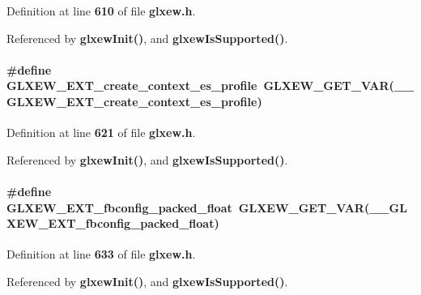 Definition at line {\bf 610} of file {\bf glxew.\+h}.



Referenced by {\bf glxew\+Init()}, and {\bf glxew\+Is\+Supported()}.

\paragraph[{G\+L\+X\+E\+W\+\_\+\+E\+X\+T\+\_\+create\+\_\+context\+\_\+es\+\_\+profile}]{\setlength{\rightskip}{0pt plus 5cm}\#define G\+L\+X\+E\+W\+\_\+\+E\+X\+T\+\_\+create\+\_\+context\+\_\+es\+\_\+profile~{\bf G\+L\+X\+E\+W\+\_\+\+G\+E\+T\+\_\+\+V\+AR}({\bf \+\_\+\+\_\+\+G\+L\+X\+E\+W\+\_\+\+E\+X\+T\+\_\+create\+\_\+context\+\_\+es\+\_\+profile})}\label{glxew_8h_ac9de5e2494db32bdc5d8cab4ae057303}


Definition at line {\bf 621} of file {\bf glxew.\+h}.



Referenced by {\bf glxew\+Init()}, and {\bf glxew\+Is\+Supported()}.

\paragraph[{G\+L\+X\+E\+W\+\_\+\+E\+X\+T\+\_\+fbconfig\+\_\+packed\+\_\+float}]{\setlength{\rightskip}{0pt plus 5cm}\#define G\+L\+X\+E\+W\+\_\+\+E\+X\+T\+\_\+fbconfig\+\_\+packed\+\_\+float~{\bf G\+L\+X\+E\+W\+\_\+\+G\+E\+T\+\_\+\+V\+AR}({\bf \+\_\+\+\_\+\+G\+L\+X\+E\+W\+\_\+\+E\+X\+T\+\_\+fbconfig\+\_\+packed\+\_\+float})}\label{glxew_8h_a73a541e81865da8e696ebcc09b0ca5ac}


Definition at line {\bf 633} of file {\bf glxew.\+h}.



Referenced by {\bf glxew\+Init()}, and {\bf glxew\+Is\+Supported()}.

